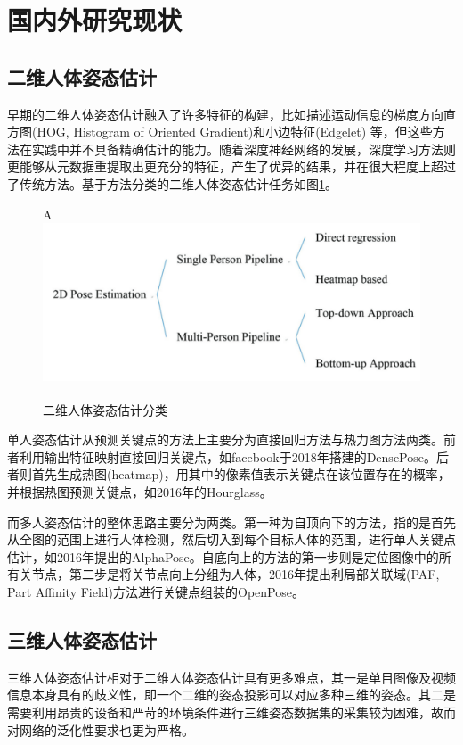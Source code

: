 \section{国内外研究现状}

\subsection{二维人体姿态估计}{}

早期的二维人体姿态估计融入了许多特征的构建，比如描述运动信息的梯度方向直方图(HOG, Histogram of Oriented Gradient)和小边特征(Edgelet)
等，但这些方法在实践中并不具备精确估计的能力。随着深度神经网络的发展，深度学习方法则更能够从元数据重提取出更充分的特征，产生了优异的结果，并在很大程度上超过了传统方法。基于方法分类的二维人体姿态估计任务如图\ref{fig:f5}。

\begin{figure}[h]
	\centering
	A\includegraphics[scale=0.6]{figures/5.png}
	\caption{二维人体姿态估计分类\textsuperscript{\cite{p22}}}
	\label{fig:f5}
\end{figure}

单人姿态估计从预测关键点的方法上主要分为直接回归方法与热力图方法两类。前者利用输出特征映射直接回归关键点，如facebook于2018年搭建的DensePose。后者则首先生成热图(heatmap)，用其中的像素值表示关键点在该位置存在的概率，并根据热图预测关键点，如2016年的Hourglass。

而多人姿态估计的整体思路主要分为两类。第一种为自顶向下的方法，指的是首先从全图的范围上进行人体检测，然后切入到每个目标人体的范围，进行单人关键点估计，如2016年提出的AlphaPose。自底向上的方法的第一步则是定位图像中的所有关节点，第二步是将关节点向上分组为人体，2016年提出利局部关联域(PAF, Part Affinity Field)方法进行关键点组装的OpenPose。

\subsection{三维人体姿态估计}{}
三维人体姿态估计相对于二维人体姿态估计具有更多难点，其一是单目图像及视频信息本身具有的歧义性，即一个二维的姿态投影可以对应多种三维的姿态。其二是需要利用昂贵的设备和严苛的环境条件进行三维姿态数据集的采集较为困难，故而对网络的泛化性要求也更为严格。

